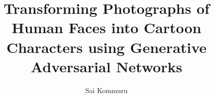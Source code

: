 
\author{Sai Kommuru}
\title{Transforming Photographs of Human Faces into Cartoon Characters using Generative Adversarial Networks }

